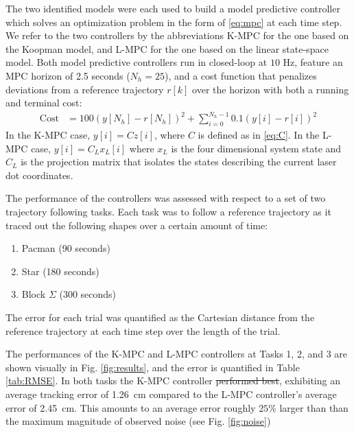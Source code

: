 The two identified models were each used to build a model predictive controller which solves an optimization problem in the form of \eqref{eq:mpc} at each time step.
We refer to the two controllers by the abbreviations K-MPC for the one based on the Koopman model, and L-MPC for the one based on the linear state-space model. 
Both model predictive controllers run in closed-loop at $10$ Hz, feature an MPC horizon of 2.5 seconds ($N_h = 25$), and a cost function that penalizes deviations from a reference trajectory $r[k]$ over the horizon with both a running and terminal cost:
\begin{align}
    \text{Cost} &= 100 \left( y[N_h] - r[N_h] \right)^2 + \sum_{i=0}^{N_h - 1} 0.1 \left( y[i] - r[i] \right)^2
\end{align}
In the K-MPC case, $y[i] = C z[i]$, where $C$ is defined as in \eqref{eq:C}.
In the L-MPC case, $y[i] = C_L x_L[i]$ where $x_L$ is the four dimensional system state and $C_L$ is the projection matrix that isolates the states describing the current laser dot coordinates. 


The performance of the controllers was assessed with respect to a set of two trajectory following tasks.
Each task was to follow a reference trajectory as it traced out the following shapes over a certain amount of time:
\begin{enumerate}
    \item Pacman (90 seconds)
    \item Star (180 seconds)
    \item Block $\Sigma$ (300 seconds)
\end{enumerate}
The error for each trial was quantified as the Cartesian distance from the reference trajectory at each time step over the length of the trial.

The performances of the K-MPC and L-MPC controllers at Tasks 1, 2, and 3 are shown visually in Fig. \ref{fig:results}, and the error is quantified in Table \ref{tab:RMSE}.
In both tasks the K-MPC controller  \sout{performed best}, exhibiting an average tracking error of 1.26~cm compared to the L-MPC controller's average error of 2.45~cm.
This amounts to an average error roughly $25\%$ larger than than the maximum magnitude of observed noise (see Fig. \ref{fig:noise})




